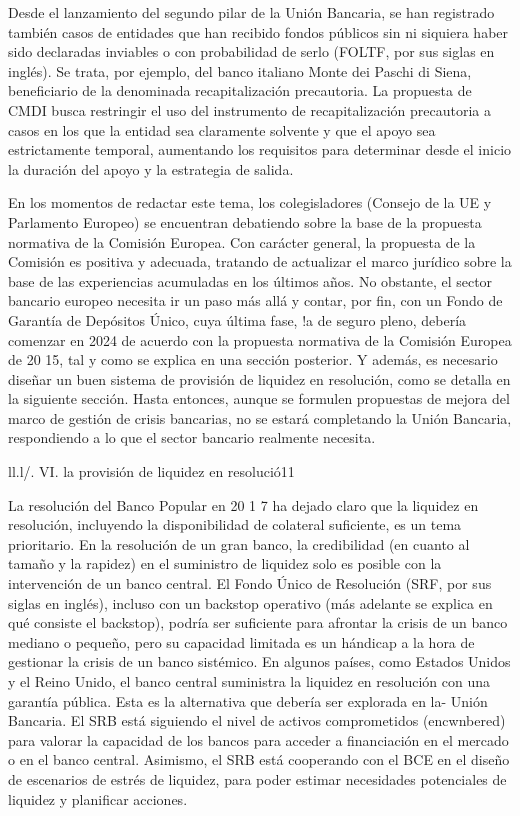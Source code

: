 \documentclass[10pt,a4paper]{article}
\begin{document}
{Desde el lanzamiento del segundo pilar de la Unión Bancaria, se han registrado también casos de entidades que han recibido fondos públicos sin ni siquiera haber sido declaradas inviables o con probabilidad de serlo (FOLTF, por sus siglas en inglés). Se trata, por ejemplo, del banco italiano Monte dei Paschi di Siena, beneficiario de la denominada recapitalización precautoria. La propuesta de CMDI busca restringir el uso del instrumento de recapitalización precautoria a casos en los que la entidad sea claramente solvente y que el apoyo sea estrictamente temporal, aumentando los requisitos para determinar desde el inicio la duración del apoyo y la estrategia de salida.



En los momentos de redactar este tema, los colegisladores (Consejo de la UE y Parlamento Europeo) se encuentran debatiendo sobre la base de la propuesta normativa de la Comisión Europea. Con carácter general, la propuesta de la Comisión es positiva y adecuada, tratando de actualizar el marco jurídico sobre la base de las experiencias acumuladas en los últimos años. No obstante, el sector bancario europeo necesita ir un paso más allá y contar, por fin, con un Fondo de Garantía de Depósitos Único, cuya última fase, !a de seguro pleno, debería comenzar en 2024 de acuerdo con la propuesta normativa de la Comisión Europea de 20 15, tal y como se explica en una sección posterior. Y además, es necesario diseñar un buen sistema de provisión de liquidez en resolución, como se detalla en la siguiente sección. Hasta entonces, aunque se formulen propuestas de mejora del marco de gestión de crisis bancarias, no se estará completando la Unión Bancaria, respondiendo a lo que el sector bancario realmente necesita.

ll.l/. VI. la provisión de liquidez en resolució11

La resolución del Banco Popular en 20 1 7 ha dejado claro que la liquidez en resolución, incluyendo la disponibilidad de colateral suficiente, es un tema prioritario. En la resolución de un gran banco, la credibilidad (en cuanto al tamaño y la rapidez) en el suministro de liquidez solo es posible con la intervención de un banco central. El Fondo Único de Resolución (SRF, por sus siglas en inglés), incluso con un backstop operativo (más adelante se explica en qué consiste el backstop), podría ser suficiente para afrontar la crisis de un banco mediano o pequeño, pero su capacidad limitada es un hándicap a la hora de gestionar la crisis de un banco sistémico. En algunos países, como Estados Unidos y el Reino Unido, el banco central suministra la liquidez en resolución con una garantía pública. Esta es la alternativa que debería ser explorada en la- Unión Bancaria. El SRB está siguiendo el nivel de activos comprometidos (encwnbered) para valorar la capacidad de los bancos para acceder a financiación en el mercado o en el banco central. Asimismo, el SRB está cooperando con el BCE en el diseño de escenarios de estrés de liquidez, para poder estimar necesidades potenciales de liquidez y planificar acciones.



}
\end{document}
